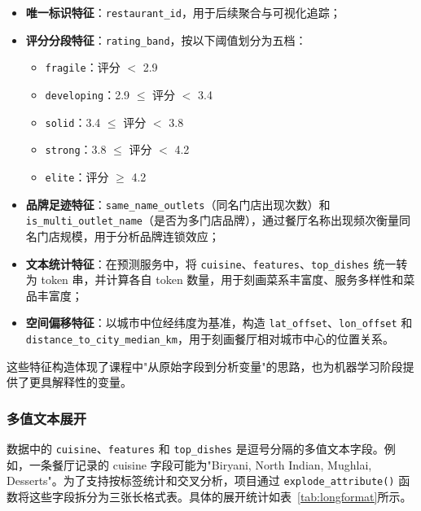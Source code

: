 \documentclass[11pt,a4paper]{article}
\begin{document}
\begin{itemize}[leftmargin=2em]
    \item \textbf{唯一标识特征}：\texttt{restaurant\_id}，用于后续聚合与可视化追踪；

    \item \textbf{评分分段特征}：\texttt{rating\_band}，按以下阈值划分为五档：
    \begin{itemize}[leftmargin=1.5em]
        \item \texttt{fragile}：评分 $<$ 2.9
        \item \texttt{developing}：2.9 $\leq$ 评分 $<$ 3.4
        \item \texttt{solid}：3.4 $\leq$ 评分 $<$ 3.8
        \item \texttt{strong}：3.8 $\leq$ 评分 $<$ 4.2
        \item \texttt{elite}：评分 $\geq$ 4.2
    \end{itemize}

    \item \textbf{品牌足迹特征}：\texttt{same\_name\_outlets}（同名门店出现次数）和 \texttt{is\_multi\_outlet\_name}（是否为多门店品牌），通过餐厅名称出现频次衡量同名门店规模，用于分析品牌连锁效应；

    \item \textbf{文本统计特征}：在预测服务中，将 \texttt{cuisine}、\texttt{features}、\texttt{top\_dishes} 统一转为 token 串，并计算各自 token 数量，用于刻画菜系丰富度、服务多样性和菜品丰富度；

    \item \textbf{空间偏移特征}：以城市中位经纬度为基准，构造 \texttt{lat\_offset}、\texttt{lon\_offset} 和 \texttt{distance\_to\_city\_median\_km}，用于刻画餐厅相对城市中心的位置关系。
\end{itemize}

这些特征构造体现了课程中"从原始字段到分析变量"的思路，也为机器学习阶段提供了更具解释性的变量。

\subsubsection{多值文本展开}

数据中的 \texttt{cuisine}、\texttt{features} 和 \texttt{top\_dishes} 是逗号分隔的多值文本字段。例如，一条餐厅记录的 cuisine 字段可能为"Biryani, North Indian, Mughlai, Desserts"。为了支持按标签统计和交叉分析，项目通过 \texttt{explode\_attribute()} 函数将这些字段拆分为三张长格式表。具体的展开统计如表~\ref{tab:longformat}所示。
\end{document}
